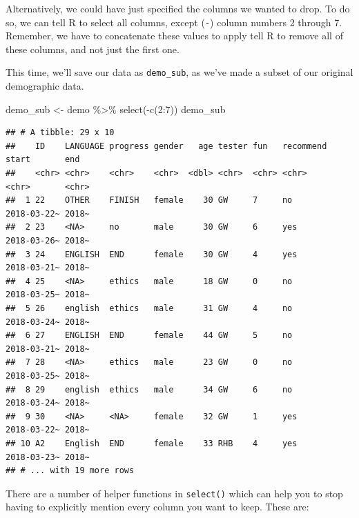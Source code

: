 \documentclass[
]{book}
\newenvironment{Shaded}{\begin{snugshade}}{\end{snugshade}}
\newcommand{\DecValTok}[1]{\textcolor[rgb]{0.00,0.00,0.81}{#1}}
\newcommand{\FunctionTok}[1]{\textcolor[rgb]{0.00,0.00,0.00}{#1}}
\newcommand{\NormalTok}[1]{#1}
\newcommand{\OtherTok}[1]{\textcolor[rgb]{0.56,0.35,0.01}{#1}}
\newcommand{\SpecialCharTok}[1]{\textcolor[rgb]{0.00,0.00,0.00}{#1}}
\begin{document}
Alternatively, we could have just specified the columns we wanted to drop. To do so, we can tell R to select all columns, except (\texttt{-}) column numbers 2 through 7. Remember, we have to concatenate these values to apply tell R to remove all of these columns, and not just the first one.

This time, we'll save our data as \texttt{demo\_sub}, as we've made a subset of our original demographic data.

\begin{Shaded}
\begin{Highlighting}[]
\NormalTok{demo\_sub }\OtherTok{\textless{}{-}}\NormalTok{ demo }\SpecialCharTok{\%\textgreater{}\%} \FunctionTok{select}\NormalTok{(}\SpecialCharTok{{-}}\FunctionTok{c}\NormalTok{(}\DecValTok{2}\SpecialCharTok{:}\DecValTok{7}\NormalTok{))}
\NormalTok{demo\_sub}
\end{Highlighting}
\end{Shaded}

\begin{verbatim}
## # A tibble: 29 x 10
##    ID    LANGUAGE progress gender   age tester fun   recommend start       end  
##    <chr> <chr>    <chr>    <chr>  <dbl> <chr>  <chr> <chr>     <chr>       <chr>
##  1 22    OTHER    FINISH   female    30 GW     7     no        2018-03-22~ 2018~
##  2 23    <NA>     no       male      30 GW     6     yes       2018-03-26~ 2018~
##  3 24    ENGLISH  END      female    30 GW     4     yes       2018-03-21~ 2018~
##  4 25    <NA>     ethics   male      18 GW     0     no        2018-03-25~ 2018~
##  5 26    english  ethics   male      31 GW     4     no        2018-03-24~ 2018~
##  6 27    ENGLISH  END      female    44 GW     5     no        2018-03-21~ 2018~
##  7 28    <NA>     ethics   male      23 GW     0     no        2018-03-25~ 2018~
##  8 29    english  ethics   male      34 GW     6     no        2018-03-24~ 2018~
##  9 30    <NA>     <NA>     female    32 GW     1     yes       2018-03-22~ 2018~
## 10 A2    English  END      female    33 RHB    4     yes       2018-03-23~ 2018~
## # ... with 19 more rows
\end{verbatim}

There are a number of helper functions in \texttt{select()} which can help you to stop having to explicitly mention every column you want to keep. These are:
\end{document}
